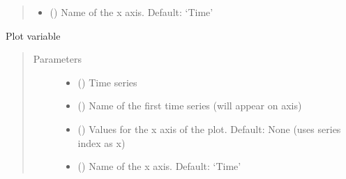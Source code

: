 \documentclass[letterpaper,10pt,english]{sphinxmanual}
\begin{document}
\begin{fulllineitems}
\begin{fulllineitems}
\begin{quote}
\begin{description}
\begin{itemize}
\item {} 
\sphinxAtStartPar
{} () \textendash{} Name of the x axis. Default: ‘Time’

\end{itemize}

\end{description}\end{quote}

\end{fulllineitems}


\begin{fulllineitems}
\label{\detokenize{plots:plots.Plots.update_canvas}}
\sphinxAtStartPar
Plot variable
\begin{quote}\begin{description}
\item[{Parameters}] \leavevmode\begin{itemize}
\item {} 
\sphinxAtStartPar
{} () \textendash{} Time series

\item {} 
\sphinxAtStartPar
{} () \textendash{} Name of the first time series (will appear on axis)

\item {} 
\sphinxAtStartPar
{} (\sphinxstyleliteralemphasis{\sphinxupquote{, }}) \textendash{} Values for the x axis of the plot. Default: None (uses series index as x)

\item {} 
\sphinxAtStartPar
{} () \textendash{} Name of the x axis. Default: ‘Time’

\end{itemize}

\end{description}\end{quote}

\end{fulllineitems}


\end{fulllineitems}
\end{document}
